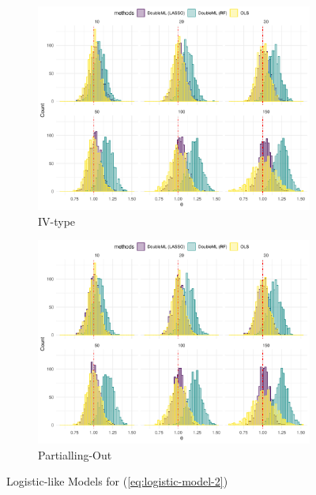 \documentclass[en,12pt,mtpro2]{elegantpaper}
\begin{document}
\begin{figure}[htp]
    \centering
    \begin{subfigure}{.41\textwidth}
        \centering
        \includegraphics[width=\linewidth]{figures/simulation-logistic6 (IV-type).pdf}
        \caption{IV-type}
    \end{subfigure}
    \begin{subfigure}{.41\textwidth}
        \centering
        \includegraphics[width=\linewidth]{figures/simulation-logistic6 (partialling out).pdf}
        \caption{Partialling-Out}
    \end{subfigure}
    \caption{Logistic-like Models for (\ref{eq:logistic-model-2})}
\end{figure}
\clearpage
\end{document}
